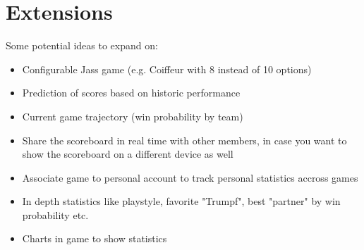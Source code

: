 \section*{Extensions}
Some potential ideas to expand on:
\begin{itemize}
    \item Configurable Jass game (e.g. Coiffeur with 8 instead of 10 options)
    \item Prediction of scores based on historic performance
    \item Current game trajectory (win probability by team)
    \item Share the scoreboard in real time with other members, in case you want to show the scoreboard on a different device as well
    \item Associate game to personal account to track personal statistics accross games
    \item In depth statistics like playstyle, favorite "Trumpf", best "partner" by win probability etc.
    \item Charts in game to show statistics
\end{itemize}
